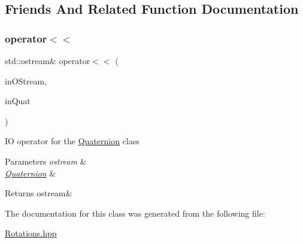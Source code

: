 \subsection{Friends And Related Function Documentation}
\mbox{\label{class_num_c_1_1_rotations_1_1_quaternion_a6d11f3a719f010cdd220642d2bb586e6}} 
\subsubsection{\texorpdfstring{operator$<$$<$}{operator<<}}
{\footnotesize\ttfamily std\+::ostream\& operator$<$$<$ (\begin{DoxyParamCaption}\item[{std\+::ostream \&}]{in\+O\+Stream,  }\item[{const \mbox{\hyperlink{class_num_c_1_1_rotations_1_1_quaternion}{Quaternion}} \&}]{in\+Quat }\end{DoxyParamCaption})\hspace{0.3cm}{\ttfamily [friend]}}

IO operator for the \mbox{\hyperlink{class_num_c_1_1_rotations_1_1_quaternion}{Quaternion}} class


\begin{DoxyParams}{Parameters}
{\em ostream} & \\
\hline
{\em \mbox{\hyperlink{class_num_c_1_1_rotations_1_1_quaternion}{Quaternion}}} & \\
\hline
\end{DoxyParams}
\begin{DoxyReturn}{Returns}
ostream\& 
\end{DoxyReturn}


The documentation for this class was generated from the following file\+:\begin{DoxyCompactItemize}
\item 
\mbox{\hyperlink{_rotations_8hpp}{Rotations.\+hpp}}\end{DoxyCompactItemize}
